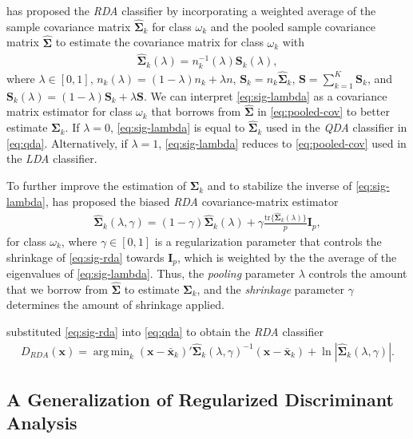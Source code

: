 \documentclass[11pt]{article}
\newcommand{\xbar}{\bar{\bm x}}
\newcommand{\tr}{\text{tr}}
\DeclareMathOperator*{\argmin}{arg\,min}
\begin{document}
\cite{Friedman:1989tm} has proposed the \emph{RDA} classifier by incorporating a weighted average of the sample covariance matrix $\widehat{\bm \Sigma}_k$ for class $\omega_k$ and the pooled sample covariance matrix $\widehat{\bm\Sigma}$ to estimate the covariance matrix for class $\omega_k$ with
\begin{align}
  \widehat{\bm\Sigma}_k(\lambda) = n_k^{-1}(\lambda) \bm S_k(\lambda),\label{eq:sig-lambda}
\end{align}
where $\lambda \in [0, 1]$, $n_k(\lambda) = (1 - \lambda) n_k + \lambda n$, $\bm S_k = n_k \widehat{\bm\Sigma}_k$, $\bm S = \sum_{k=1}^K \bm S_k$, and $\bm S_k(\lambda) = (1 - \lambda) \bm S_k + \lambda \bm S$. We can interpret \eqref{eq:sig-lambda} as a covariance matrix estimator for class $\omega_k$ that borrows from $\widehat{\bm\Sigma}$ in \eqref{eq:pooled-cov} to better estimate $\bm \Sigma_k$. If $\lambda = 0$, \eqref{eq:sig-lambda} is equal to $\widehat{\bm\Sigma}_k$ used in the \emph{QDA} classifier in \eqref{eq:qda}. Alternatively, if $\lambda = 1$, \eqref{eq:sig-lambda} reduces to \eqref{eq:pooled-cov} used in the \emph{LDA} classifier.

To further improve the estimation of $\bm \Sigma_k$ and to stabilize the inverse of \eqref{eq:sig-lambda}, \cite{Friedman:1989tm} has proposed the biased \emph{RDA} covariance-matrix estimator
\begin{align}
	\widehat{\bm\Sigma}_k(\lambda, \gamma) = (1 - \gamma) \widehat{\bm\Sigma}_k(\lambda) + \gamma \frac{\tr\{\widehat{\bm\Sigma}_k(\lambda)\}}{p} \bm I_p,\label{eq:sig-rda}
\end{align}
for class $\omega_k$, where $\gamma \in [0, 1]$ is a regularization parameter that controls the shrinkage of \eqref{eq:sig-rda}  towards $\bm I_p$, which is weighted by the the average of the eigenvalues of \eqref{eq:sig-lambda}. Thus, the \emph{pooling} parameter $\lambda$ controls the amount that we borrow from $\widehat{\bm\Sigma}$ to estimate $\bm \Sigma_k$, and the \emph{shrinkage} parameter $\gamma$ determines the amount of shrinkage applied.

\cite{Friedman:1989tm} substituted \eqref{eq:sig-rda} into \eqref{eq:qda} to obtain the \emph{RDA} classifier
\begin{align}
	D_{RDA}(\bm x) = \argmin_{k}  (\bm x - \xbar_k)'\widehat{\bm\Sigma}_k(\lambda, \gamma)^{-1}(\bm x - \xbar_k)  + \ln |\widehat{\bm\Sigma}_k(\lambda, \gamma)|. \label{eq:rda}
\end{align}

\subsection{A Generalization of Regularized Discriminant Analysis}
\end{document}
